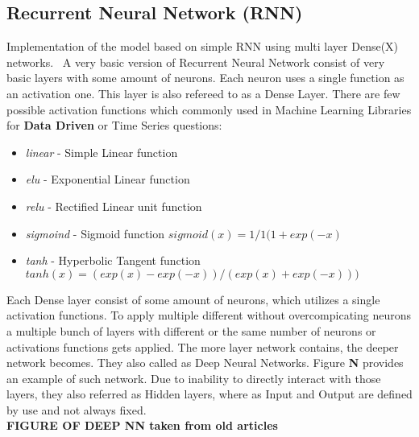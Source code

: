 \subsection{Recurrent Neural Network (RNN)}\label{sec:RNN}
    Implementation of the model based on simple RNN using multi layer Dense(X) networks.~\cite{lees2010theoretical}
    A very basic version of Recurrent Neural Network consist of very basic layers with some amount of neurons.
    Each neuron uses a single function as an activation one.
    This layer is also refereed to as a Dense Layer.
    There are few possible activation functions which commonly used in Machine Learning Libraries for \textbf{Data Driven} or Time Series questions:
    \begin{itemize}
        \item \textit{linear} - Simple Linear function
        \item \textit{elu} - Exponential Linear function
        \item \textit{relu} - Rectified Linear unit function
        \item \textit{sigmoind} - Sigmoid function $sigmoid(x) = 1/1(1+exp(-x)$
        \item \textit{tanh} - Hyperbolic Tangent function $tanh(x) = (exp(x)-exp(-x))/(exp(x)+exp(-x)))$
    \end{itemize}
    Each Dense layer consist of some amount of neurons, which utilizes a single activation functions.
    To apply multiple different without overcompicating neurons a multiple bunch of layers with different or the same number of neurons or activations functions gets applied. The more layer network contains, the deeper network becomes. They also called as Deep Neural Networks.
    Figure \textbf{N} provides an example of such network.
    Due to inability to directly interact with those layers, they also referred as Hidden layers, where as Input and Output are defined by use and not always fixed. \\
    \textbf{FIGURE OF DEEP NN taken from old articles}



